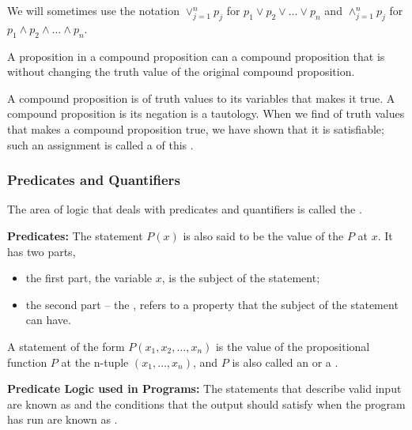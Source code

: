We will sometimes use the notation $\vee^{n}_{j=1}p_j$ for 
$p_1 \vee p_2 \vee \dots \vee p_n$
and $\wedge^{n}_{j=1}p_j$ for
$p_1 \wedge p_2 \wedge \dots \wedge p_n$.

A proposition in a compound proposition can 
a compound proposition that is 
without changing the truth value of the original compound proposition.

A compound proposition is   
 of truth values to its variables
that makes it true.
A compound proposition is  
its negation is a tautology.
When we find  of truth values that makes a 
compound proposition true, we have shown that it is satisfiable; 
such an assignment is called a  of this 
.

\crule

\subsubsection{Predicates and Quantifiers}

The area of logic that deals with predicates and quantifiers is called the 
.

\textbf{Predicates:} The statement $P(x)$ is also said to be the value of the 
 $P$ at $x$.
It has two parts,
\begin{itemize}
  \item the first part, the variable $x$,
    is the subject of the statement;
  \item the second part -- the ,
    refers to a property that the subject of the statement can have.
\end{itemize}

A statement of the form $P(x_1, x_2, \dots, x_n)$ is the value of 
the propositional function $P$ at the n-tuple $(x_1, \dots, x_n)$, 
and $P$ is also called an  or a 
.

\textbf{Predicate Logic used in Programs:} 
The statements that describe valid input are known as 
 and the conditions that the output should 
satisfy when the program has run are known as .

